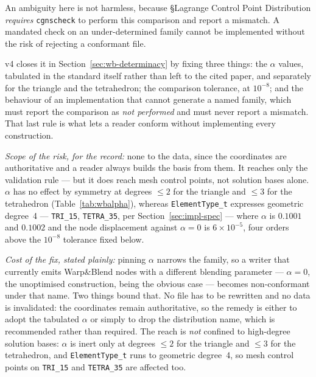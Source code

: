\documentclass[11pt,letterpaper]{article}
\newif\ifvfourdraft
\newenvironment{v4block}{\ifvfourdraft\color{v4violet}\fi\ignorespaces}{\par}
\begin{document}
{\begin{v4block}
\begin{enumerate}[leftmargin=1.4em,itemsep=0.5em]
    An ambiguity here is not harmless, because \S Lagrange Control Point
    Distribution \emph{requires} \texttt{cgnscheck} to perform this comparison
    and report a mismatch.  A mandated check on an under-determined family
    cannot be implemented without the risk of rejecting a conformant file.

    v4 closes it in Section~\ref{sec:wb-determinacy} by fixing three things: the
    $\alpha$ values, tabulated in the standard itself rather than left to the
    cited paper, and separately for the triangle and the tetrahedron; the
    comparison tolerance, at $10^{-8}$; and the behaviour of an implementation
    that cannot generate a named family, which must report the comparison as
    \emph{not performed} and must never report a mismatch.  That last rule is
    what lets a reader conform without implementing every construction.

    \textit{Scope of the risk, for the record:} none to the data, since the
    coordinates are authoritative and a reader always builds the basis from them.
    It reaches only the validation rule --- but it does reach mesh control points,
    not solution bases alone.  $\alpha$ has no effect by symmetry at degrees
    $\le 2$ for the triangle and $\le 3$ for the tetrahedron
    (Table~\ref{tab:wbalpha}), whereas \texttt{ElementType\_t} expresses geometric
    degree~4 --- \texttt{TRI\_15}, \texttt{TETRA\_35}, per
    Section~\ref{sec:impl-spec} --- where $\alpha$ is $0.1001$ and $0.1002$ and
    the node displacement against $\alpha = 0$ is $6\times10^{-5}$, four orders
    above the $10^{-8}$ tolerance fixed below.

    \textit{Cost of the fix, stated plainly:} pinning $\alpha$ narrows the family,
    so a writer that currently emits Warp\&Blend nodes with a different blending
    parameter --- $\alpha = 0$, the unoptimised construction, being the obvious
    case --- becomes non-conformant under that name.  Two things bound that.  No
    file has to be rewritten and no data is invalidated: the coordinates remain
    authoritative, so the remedy is either to adopt the tabulated $\alpha$ or
    simply to drop the distribution name, which is recommended rather than
    required.  The reach is \emph{not} confined to
    high-degree solution bases: $\alpha$ is inert only at degrees $\le 2$ for the
    triangle and $\le 3$ for the tetrahedron, and \texttt{ElementType\_t} runs to
    geometric degree~4, so mesh control points on \texttt{TRI\_15} and
    \texttt{TETRA\_35} are affected too.


\end{enumerate}
\end{v4block}}
\end{document}
